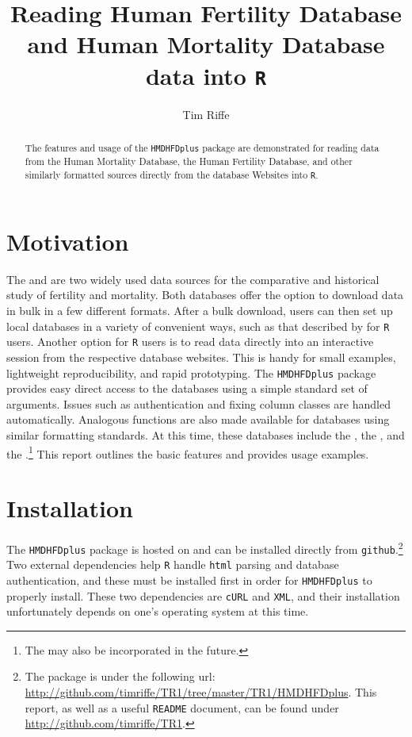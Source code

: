 \documentclass{article}
\begin{document}
\title{Reading Human Fertility Database and Human Mortality Database data into \texttt{R}}
\author{Tim Riffe}
\maketitle
\begin{abstract}
The features and usage of the \texttt{HMDHFDplus} package are demonstrated for
reading data from the Human Mortality Database, the Human Fertility Database,
and other similarly formatted sources directly from the database Websites into
\texttt{R}.
\end{abstract}

\section{Motivation}
The \citet{HFD} and \citet{HMD} are two widely used data sources
for the comparative and historical study of fertility and mortality. Both
databases offer the option to download data in bulk in a few different formats. After a bulk
download, users can then set up local databases in a variety of
convenient ways, such as that described by \citet{minton2015} for \texttt{R}
\citep{Rcitation} users. Another option for \texttt{R} users is to read data
directly into an interactive session from the respective database websites. This
is handy for small examples, lightweight reproducibility, and rapid
prototyping.
The \texttt{HMDHFDplus} package provides easy direct access to the databases using a simple standard set of arguments. Issues such as authentication and fixing column classes are handled
automatically. Analogous functions are also made
available for databases using similar formatting standards. At this time, these
databases include the \citet{JMD}, the \citet{CHMD}, and the
\citet{HFC}.\footnote{The \citet{HLD} may also be
incorporated in the future.} This report outlines the basic features and provides usage
examples.

\section{Installation}
The \texttt{HMDHFDplus} package is hosted on and can be installed
directly from \texttt{github}.\footnote{The package is under the following url:
\url{http://github.com/timriffe/TR1/tree/master/TR1/HMDHFDplus}. This report,
as well as a useful \texttt{README} document, can be found under
\url{http://github.com/timriffe/TR1}.} Two external dependencies help \texttt{R}
handle \texttt{html} parsing and database authentication, and these must be installed first in order for \texttt{HMDHFDplus} to properly install.
These two dependencies are \texttt{cURL} and \texttt{XML}, and their
installation unfortunately depends on one's operating system at this time.
\end{document}
